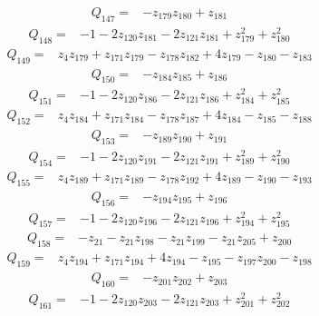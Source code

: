 \[\begin{aligned}Q_{147}={}&-z_{179}z_{180}+z_{181}
\end{aligned}\]
\[\begin{aligned}Q_{148}={}&-1-2z_{120}z_{181}-2z_{121}z_{181}+z_{179}^{2}+z_{180}^{2}
\end{aligned}\]
\[\begin{aligned}Q_{149}={}&z_{4}z_{179}+z_{171}z_{179}-z_{178}z_{182}+4z_{179}-z_{180}-z_{183}
\end{aligned}\]
\[\begin{aligned}Q_{150}={}&-z_{184}z_{185}+z_{186}
\end{aligned}\]
\[\begin{aligned}Q_{151}={}&-1-2z_{120}z_{186}-2z_{121}z_{186}+z_{184}^{2}+z_{185}^{2}
\end{aligned}\]
\[\begin{aligned}Q_{152}={}&z_{4}z_{184}+z_{171}z_{184}-z_{178}z_{187}+4z_{184}-z_{185}-z_{188}
\end{aligned}\]
\[\begin{aligned}Q_{153}={}&-z_{189}z_{190}+z_{191}
\end{aligned}\]
\[\begin{aligned}Q_{154}={}&-1-2z_{120}z_{191}-2z_{121}z_{191}+z_{189}^{2}+z_{190}^{2}
\end{aligned}\]
\[\begin{aligned}Q_{155}={}&z_{4}z_{189}+z_{171}z_{189}-z_{178}z_{192}+4z_{189}-z_{190}-z_{193}
\end{aligned}\]
\[\begin{aligned}Q_{156}={}&-z_{194}z_{195}+z_{196}
\end{aligned}\]
\[\begin{aligned}Q_{157}={}&-1-2z_{120}z_{196}-2z_{121}z_{196}+z_{194}^{2}+z_{195}^{2}
\end{aligned}\]
\[\begin{aligned}Q_{158}={}&-z_{21}-z_{21}z_{198}-z_{21}z_{199}-z_{21}z_{205}+z_{200}
\end{aligned}\]
\[\begin{aligned}Q_{159}={}&z_{4}z_{194}+z_{171}z_{194}+4z_{194}-z_{195}-z_{197}z_{200}-z_{198}
\end{aligned}\]
\[\begin{aligned}Q_{160}={}&-z_{201}z_{202}+z_{203}
\end{aligned}\]
\[\begin{aligned}Q_{161}={}&-1-2z_{120}z_{203}-2z_{121}z_{203}+z_{201}^{2}+z_{202}^{2}
\end{aligned}\]
